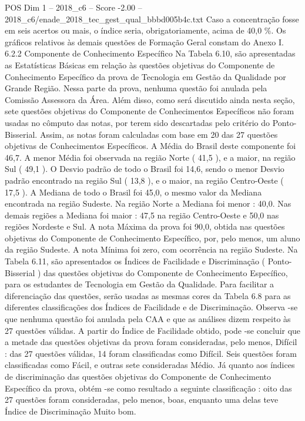\begin{textsample}{POS Dim 1 – 2018\_c6 – Score -2.00 – 2018\_c6/enade\_2018\_tec\_gest\_qual\_bbbd005b4c.txt}
Caso a concentração fosse em seis acertos ou mais, o índice seria, obrigatoriamente, acima de 40,0 \%.
Os gráficos relativos às demais questões de Formação Geral constam do Anexo I. 6.2.2 Componente de Conhecimento Específico Na Tabela 6.10, são apresentadas as Estatísticas Básicas em relação às questões objetivas do Componente de Conhecimento Específico da prova de Tecnologia em Gestão da Qualidade por Grande Região.
Nessa parte da prova, nenhuma questão foi anulada pela Comissão Assessora da Área.
Além disso, como será discutido ainda nesta seção, sete questões objetivas do Componente de Conhecimentos Específicos não foram usadas no cômputo das notas, por terem sido descartadas pelo critério do Ponto-Bisserial.
Assim, as notas foram calculadas com base em 20 das 27 questões objetivas de Conhecimentos Específicos.
A Média do Brasil deste componente foi 46,7.
A menor Média foi observada na região Norte ( 41,5 ), e a maior, na região Sul ( 49,1 ).
O Desvio padrão de todo o Brasil foi 14,6, sendo o menor Desvio padrão encontrado na região Sul ( 13,8 ), e o maior, na região Centro-Oeste ( 17,5 ).
A Mediana de todo o Brasil foi 45,0, o mesmo valor da Mediana encontrada na região Sudeste.
Na região Norte a Mediana foi menor : 40,0.
Nas demais regiões a Mediana foi maior : 47,5 na região Centro-Oeste e 50,0 nas regiões Nordeste e Sul.
A nota Máxima da prova foi 90,0, obtida nas questões objetivas do Componente de Conhecimento Específico, por, pelo menos, um aluno da região Sudeste.
A nota Mínima foi zero, com ocorrência na região Sudeste.
Na Tabela 6.11, são apresentados os Índices de Facilidade e Discriminação ( Ponto-Bisserial ) das questões objetivas do Componente de Conhecimento Específico, para os estudantes de Tecnologia em Gestão da Qualidade.
Para facilitar a diferenciação das questões, serão usadas as mesmas cores da Tabela 6.8 para as diferentes classificações dos Índices de Facilidade e de Discriminação.
Observa -se que nenhuma questão foi anulada pela CAA e que as análises dizem respeito às 27 questões válidas.
A partir do Índice de Facilidade obtido, pode -se concluir que a metade das questões objetivas da prova foram consideradas, pelo menos, Difícil : das 27 questões válidas, 14 foram classificadas como Difícil.
Seis questões foram classificadas como Fácil, e outras sete consideradas Médio.
Já quanto aos índices de discriminação das questões objetivas do Componente de Conhecimento Específico da prova, obtém -se como resultado a seguinte classificação : oito das 27 questões foram consideradas, pelo menos, boas, enquanto uma delas teve Índice de Discriminação Muito bom.

\end{textsample}
